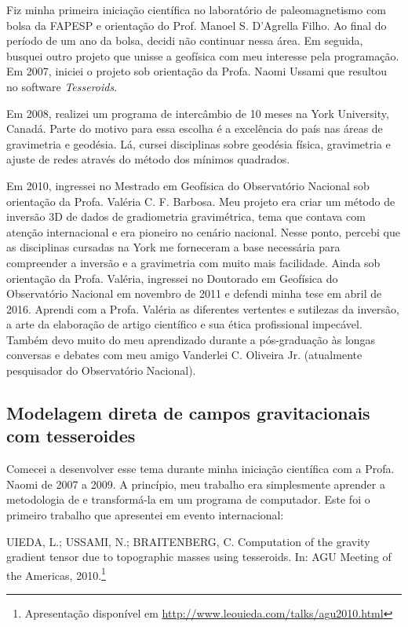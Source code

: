 Fiz minha primeira iniciação científica no laboratório de paleomagnetismo com
bolsa da FAPESP e orientação do Prof. Manoel S. D'Agrella Filho.
Ao final do período de um ano da bolsa, decidi não continuar nessa área.
Em seguida, busquei outro projeto que unisse a geofísica
com meu interesse pela programação.
Em 2007, iniciei o projeto sob orientação da
Profa. Naomi Ussami que resultou no software \textit{Tesseroids}.

Em 2008, realizei um programa de intercâmbio de 10 meses na York University,
Canadá.
Parte do motivo para essa escolha é a excelência do país nas áreas de
gravimetria e geodésia.
Lá, cursei disciplinas sobre geodésia física, gravimetria e ajuste de redes
através do método dos mínimos quadrados.

Em 2010, ingressei no Mestrado em Geofísica do Observatório Nacional sob
orientação da Profa. Valéria C. F. Barbosa.
Meu projeto era criar um método de inversão 3D de dados de gradiometria
gravimétrica, tema que contava com atenção internacional e era pioneiro no
cenário nacional.
Nesse ponto, percebi que as disciplinas cursadas na York me forneceram a base
necessária para compreender a inversão e a gravimetria com muito mais
facilidade.
Ainda sob orientação da Profa. Valéria, ingressei no Doutorado em Geofísica do
Observatório Nacional em novembro de 2011 e defendi minha tese em abril de
2016.
Aprendi com a Profa. Valéria
as diferentes vertentes e sutilezas da inversão,
a arte da elaboração de artigo científico
e sua ética profissional impecável.
Também devo muito do meu aprendizado durante a pós-graduação às longas
conversas e debates com meu amigo Vanderlei C. Oliveira Jr. (atualmente
pesquisador do Observatório Nacional).



\subsection{Modelagem direta de campos gravitacionais com tesseroides}

Comecei a desenvolver esse tema durante minha iniciação científica com a
Profa. Naomi de 2007 a 2009.
A princípio, meu trabalho era simplesmente aprender a metodologia de
\citet{wild-pfeiffer2008} e transformá-la em um programa de computador.
Este foi o primeiro trabalho que apresentei em evento internacional:

\begin{displayquote}
    UIEDA, L.; USSAMI, N.; BRAITENBERG, C. Computation of the gravity
    gradient tensor due to topographic masses using tesseroids. In: AGU Meeting
    of the Americas, 2010.\footnote{Apresentação disponível em
    \url{http://www.leouieda.com/talks/agu2010.html}}
\end{displayquote}

